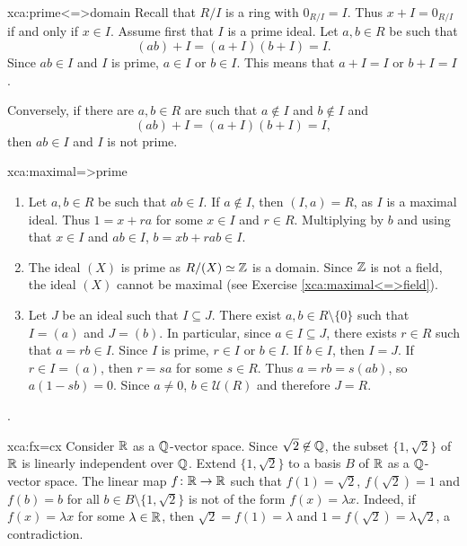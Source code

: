 \begin{sol}{xca:prime<=>domain}
    Recall that $R/I$ is a ring with 
    $0_{R/I}=I$. Thus $x+I=0_{R/I}$ if and only if $x\in I$. 
    Assume first that $I$ is a prime ideal. 
    Let $a,b\in R$ be such that 
    \[
    (ab)+I=(a+I)(b+I)=I.
    \]
    Since
    $ab\in I$ and $I$ is prime, $a\in I$ or $b\in I$. This means
    that $a+I=I$ or $b+I=I$. 
    
    Conversely, if there are $a,b\in R$ 
    are such that $a\not\in I$ and $b\not\in I$ and 
    \[
    (ab)+I=(a+I)(b+I)=I,
    \]
    then $ab\in I$ and $I$ is not prime. 
\end{sol}

\begin{sol}{xca:maximal=>prime}\
\begin{enumerate}
    \item Let $a,b\in R$ be such that $ab\in I$. If $a\not\in I$, 
    then $(I,a)=R$, as $I$ is a maximal ideal. Thus $1=x+ra$ for
    some $x\in I$ and $r\in R$. Multiplying by $b$ and using
    that $x\in I$ and $ab\in I$,  
    $b=xb+rab\in I$. 
    \item The ideal $(X)$ is prime as $R/(X)\simeq\mathbb{Z}$ is a domain. Since     $\mathbb{Z}$ is not a field, the ideal $(X)$ cannot be maximal (see
        Exercise \ref{xca:maximal<=>field}). 
    \item Let $J$ be an ideal such that $I\subseteq J$. There 
        exist $a,b\in R\setminus\{0\}$
        such that $I=(a)$ and $J=(b)$. In particular, 
        since $a\in I\subseteq J$, there exists $r\in R$ such that
        $a=rb\in I$. Since $I$ is prime, $r\in I$ or $b\in I$. 
        If $b\in I$, then $I=J$. If $r\in I=(a)$, then 
        $r=sa$ for some $s\in R$. Thus  
        $a=rb=s(ab)$, so $a(1-sb)=0$. Since $a\ne 0$, 
        $b\in\mathcal{U}(R)$ and therefore $J=R$. 
\end{enumerate}
. 
\end{sol}

\begin{sol}{xca:fx=cx}
    Consider $\mathbb{R}$ as a $\mathbb{Q}$-vector space. 
    Since $\sqrt{2}\not\in\mathbb{Q}$, the subset $\{1,\sqrt{2}\}$ of $\mathbb{R}$ 
    is linearly independent 
    over $\mathbb{Q}$. Extend $\{1,\sqrt{2}\}$ 
    to a basis $B$ of $\mathbb{R}$ as a $\mathbb{Q}$-vector space. The
    linear map $f\colon\mathbb{R}\to\mathbb{R}$ such that
    $f(1)=\sqrt{2}$, $f(\sqrt{2})=1$ and $f(b)=b$ for all $b\in B\setminus\{1,\sqrt{2}\}$ 
    is not of the form $f(x)=\lambda x$. Indeed, if $f(x)=\lambda x$ for some $\lambda\in\mathbb{R}$, 
    then $\sqrt{2}=f(1)=\lambda$ and $1=f(\sqrt{2})=\lambda\sqrt{2}$, a contradiction. 
\end{sol}


